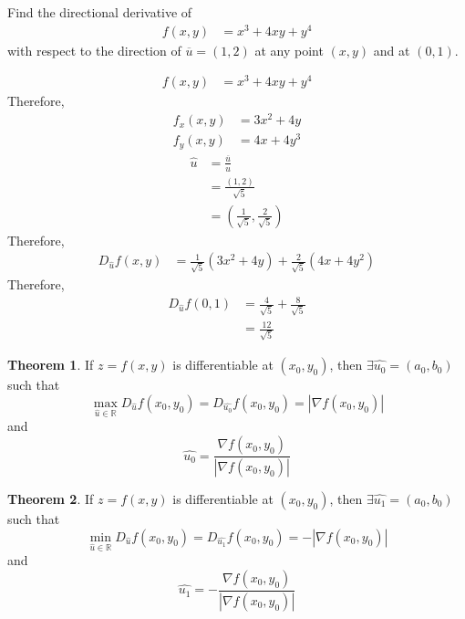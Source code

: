 \documentclass[fleqn, a4paper, 8pt, twoside]{amsart}
\theoremstyle{definition}
\theoremstyle{bluedefinition}
\theoremstyle{redtheorem}
\newtheorem{theorem}{Theorem}
\begin{document}
\begin{multicols}{2}
\begin{spacing}{0.7}
\begin{question}
	Find the directional derivative of
	\begin{align*}
		f(x,y) & = x^3 + 4 x y + y^4
	\end{align*}
	with respect to the direction of $\overline{u} = (1,2)$ at any point $(x,y)$ and at $(0,1)$.
\end{question}

\begin{solution}
	\begin{align*}
		f(x,y) & = x^3 + 4 x y + y^4
	\end{align*}
	Therefore,
	\begin{align*}
		f_x(x,y) & = 3 x^2 + 4 y \\
		f_y(x,y) & = 4 x + 4 y^3
	\end{align*}
	\begin{align*}
		\hat{u} & = \frac{\overline{u}}{u} \\
                        & = \frac{(1,2)}{\sqrt{5}} \\
                        & = \left( \frac{1}{\sqrt{5}} , \frac{2}{\sqrt{5}} \right)
	\end{align*}
	Therefore,
	\begin{align*}
		D_{\hat{u}} f(x,y) & = \frac{1}{\sqrt{5}} (3 x^2 + 4 y) + \frac{2}{\sqrt{5}} (4 x + 4 y^2)
	\end{align*}
	Therefore,
	\begin{align*}
		D_{\hat{u}} f(0,1) & = \frac{4}{\sqrt{5}} + \frac{8}{\sqrt{5}} \\
                                   & = \frac{12}{\sqrt{5}}
	\end{align*}
\end{solution}

\begin{theorem}
	If $z = f(x,y)$ is differentiable at $(x_0,y_0)$, then $\exists \hat{u_0} = (a_0, b_0)$ such that
	\begin{equation*}
		\max\limits_{\hat{u} \in \mathbb{R}} D_{\hat{u}} f(x_0, y_0) = D_{\hat{u_0}} f(x_0, y_0) = \left| \nabla f(x_0, y_0) \right|
	\end{equation*}
	and
	\begin{equation*}
		\hat{u_0} = \frac{\nabla f(x_0, y_0)}{\left| \nabla f(x_0, y_0) \right|}
	\end{equation*}
\end{theorem}

\begin{theorem}
	If $z = f(x,y)$ is differentiable at $(x_0,y_0)$, then $\exists \hat{u_1} = (a_0, b_0)$ such that
	\begin{equation*}
		\min\limits_{\hat{u} \in \mathbb{R}} D_{\hat{u}} f(x_0, y_0) = D_{\hat{u_1}} f(x_0, y_0) = -\left| \nabla f(x_0, y_0) \right|
	\end{equation*}
	and
	\begin{equation*}
		\hat{u_1} = -\frac{\nabla f(x_0, y_0)}{\left| \nabla f(x_0, y_0) \right|}
	\end{equation*}
\end{theorem}


\end{spacing}
\end{multicols}
\end{document}
